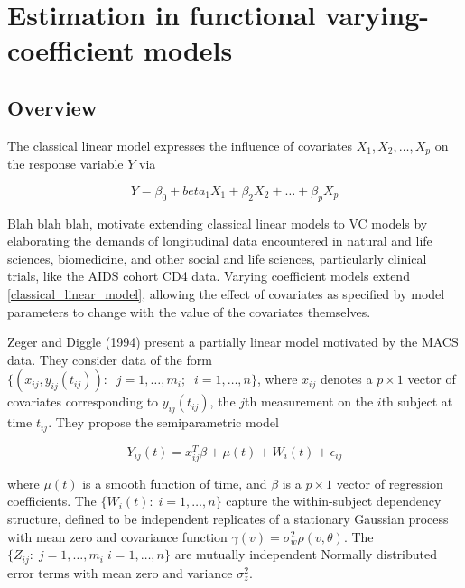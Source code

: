 \documentclass[12pt]{article}
\begin{document}

\section{Estimation in functional varying-coefficient models}
\subsection{Overview}

The classical linear model expresses the influence of covariates $X_1, X_2, \dots, X_p$ on the response variable $Y$ via 

\begin{equation}
Y = \beta_0 + beta_1 X_1 + \beta_2 X_2 + \dots + \beta_p X_p \label{classical_linear_model}
\end{equation}

Blah blah blah, motivate extending classical linear models to VC models by elaborating the demands of longitudinal data encountered in natural and life sciences, biomedicine, and other social and life sciences, particularly clinical trials, like the AIDS cohort CD4 data. Varying coefficient models extend \eqref{classical_linear_model}, allowing the effect of covariates as specified by model parameters to change with the value of the covariates themselves.  

Zeger and Diggle (1994) present a partially linear model motivated by the MACS data. They consider data of the form $\lbrace \left(x_{ij},y_{ij}\left(t_{ij}\right)\right): \;\; j=1,\dots,m_i;\;\;i=1,\dots,n \rbrace$, where $x_{ij}$ denotes a $p \times 1$ vector of covariates corresponding to $y_{ij}\left(t_{ij}\right)$, the $j$th measurement on the $i$th subject at time $t_{ij}$.  They propose the semiparametric model 

\begin{equation}
Y_{ij}\left(t\right) =  x_{ij}^T\beta + \mu\left(t\right) + W_i\left(t\right) + \epsilon_{ij} \label{zeger_diggle_VC_model}
\end{equation}

where $\mu\left(t\right)$ is a smooth function of time, and $\beta$ is a $p \times 1$ vector of regression coefficients. The $\lbrace W_i\left(t\right):\;i=1,\dots,n \rbrace$ capture the within-subject dependency structure, defined to be independent replicates of a stationary Gaussian process with mean zero and covariance function $\gamma\left(v\right) = \sigma_w^2\rho\left(v, \theta \right)$. The $\lbrace Z_{ij}:\;j=1,\dots,m_i\;i=1,\dots,n \rbrace$ are mutually independent Normally distributed error terms with mean zero and variance $\sigma_z^2$.
\end{document}
